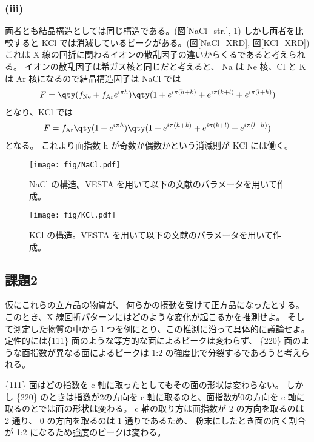 \documentclass[11pt,dvipdfmx,a4paper]{jsarticle}
\begin{document}
\subsubsection*{(iii)}
両者とも結晶構造としては同じ構造である。(図\ref{NaCl_str.}, \ref{KCl_str.})
しかし両者を比較すると KCl では消滅しているピークがある。(図\ref{NaCl_XRD}, 図\ref{KCl_XRD})
これは X 線の回折に関わるイオンの散乱因子の違いからくるであると考えられる。
イオンの散乱因子は希ガス核と同じだと考えると、
Na は Ne 核、Cl と K は Ar 核になるので結晶構造因子は
NaCl では
\begin{align}
	F = \qty(f_{\text{Ne}}+f_{\text{Ar}}e^{i\pi h})\qty(1+e^{i\pi(h+k)}+e^{i\pi(k+l)}+e^{i\pi(l+h)})
\end{align}
となり、KCl では
\begin{align}
	F = f_{\text{Ar}}\qty(1 + e^{i\pi h})\qty(1+e^{i\pi(h+k)}+e^{i\pi(k+l)}+e^{i\pi(l+h)})
\end{align}
となる。
これより面指数 h が奇数か偶数かという消滅則が KCl には働く。
\begin{figure}[h]
	\centering
	\begin{minipage}[t]{0.48\columnwidth}
		\centering
		\texttt{[image: fig/NaCl.pdf]}
		\caption{NaCl の構造。VESTA を用いて以下の文献のパラメータを用いて作成。\cite{cfi_NaCl}}
		\label{NaCl_str.}
	\end{minipage}
	\hfill
	\begin{minipage}[t]{0.48\columnwidth}
		\centering
		\texttt{[image: fig/KCl.pdf]}
		\caption{KCl の構造。VESTA を用いて以下の文献のパラメータを用いて作成。\cite{cfi_NaCl}}
		\label{KCl_str.}
	\end{minipage}
\end{figure}

\subsection*{課題2} 仮にこれらの立方晶の物質が、
何らかの摂動を受けて正方晶になったとする。
このとき、X 線回折パターンにはどのような変化が起こるかを推測せよ。
そして測定した物質の中から１つを例にとり、この推測に沿って具体的に議論せよ。\\

定性的には\{111\} 面のような等方的な面によるピークは変わらず、
\{220\} 面のような面指数が異なる面によるピークは 1:2 の強度比で分裂するであろうと考えられる。

\{111\} 面はどの指数を c 軸に取ったとしてもその面の形状は変わらない。%
しかし \{220\} のときは指数が2の方向を c 軸に取るのと、面指数が0の方向を c 軸に取るのとでは面の形状は変わる。
c 軸の取り方は面指数が 2 の方向を取るのは 2 通り、 0 の方向を取るのは 1 通りであるため、
粉末にしたとき面の向く割合が 1:2 になるため強度のピークは変わる。
\end{document}
